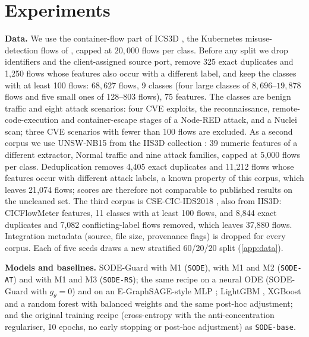 \documentclass{article}
\theoremstyle{definition}
\begin{document}
\section{Experiments}\label{sec:exp}
\textbf{Data.} We use the container-flow part of ICS3D \citep{anon_ics3d}, the
Kubernetes misuse-detection flows of \citet{amin2024misuse}, capped at
$20{,}000$ flows per class. Before
any split we drop identifiers and the client-assigned source port, remove 325
exact duplicates and 1{,}250 flows whose features also occur with a different
label, and keep the classes with at least 100 flows: $68{,}627$ flows, 9 classes
(four large classes of $8{,}696$--$19{,}878$ flows and five small ones of
128--803 flows), 75 features. The classes are benign traffic and eight attack
scenarios: four CVE exploits, the reconnaissance, remote-code-execution and
container-escape stages of a Node-RED attack, and a Nuclei scan; three CVE
scenarios with fewer than 100 flows are excluded. As a second corpus we use
UNSW-NB15 \citep{moustafa2015unsw} from the IIS3D collection \citep{anon_iis3d}:
39 numeric features of a different extractor, Normal traffic and nine attack
families, capped at 5{,}000 flows per class. Deduplication removes 4{,}405 exact
duplicates and 11{,}212 flows whose features occur with different attack labels,
a known property of this corpus, which leaves 21{,}074 flows; scores are
therefore not comparable to published results on the uncleaned set. The third
corpus is CSE-CIC-IDS2018 \citep{sharafaldin2018cicids}, also from IIS3D:
CICFlowMeter features, 11 classes with at least 100 flows, and 8{,}844 exact
duplicates and 7{,}082 conflicting-label flows removed, which leaves 37{,}880
flows. Integration metadata (source, file size, provenance flags) is dropped
for every corpus. Each of five seeds draws a new stratified
60/20/20 split (\cref{app:data}).

\textbf{Models and baselines.} SODE-Guard with M1 (\texttt{SODE}), with M1 and
M2 (\texttt{SODE-AT}) and with M1 and M3 (\texttt{SODE-RS}); the same recipe on
a neural ODE (SODE-Guard with $g_\theta=0$) and on an E-GraphSAGE-style MLP
\citep{lo2022egraphsage}; LightGBM \citep{ke2017lightgbm}, XGBoost
\citep{chen2016xgboost} and a random forest \citep{breiman2001rf} with balanced
weights and the same post-hoc adjustment; and the original training recipe
(cross-entropy with the anti-concentration regulariser, 10 epochs, no early
stopping or post-hoc adjustment) as \texttt{SODE-base}.
\end{document}
